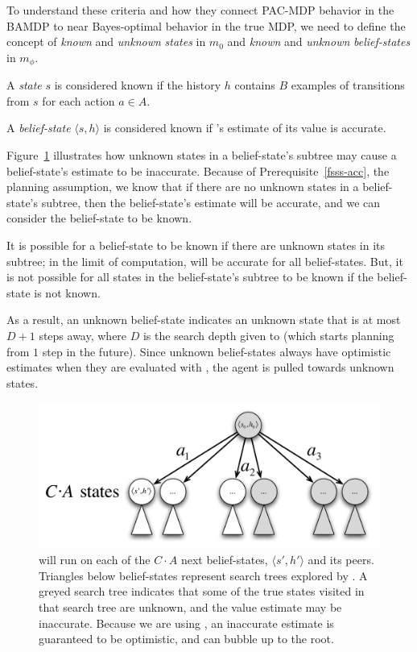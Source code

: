 To understand these criteria and how they connect PAC-MDP behavior in the BAMDP to near Bayes-optimal behavior in the true MDP, we need to define the concept of \emph{known} and \emph{unknown} \emph{states} in $m_0$ and  \emph{known} and \emph{unknown} \emph{belief-states} in $m_\phi$.

A \emph{state} $s$ is considered known if the history $h$ contains $B$ examples of transitions from $s$ for each action $a\in A$.

A \emph{belief-state} $\langle s, h \rangle$ is considered known if 's estimate of its value is accurate.

Figure~\ref{fig:bfs3tree} illustrates how unknown states in a belief-state's  subtree may cause a belief-state's estimate to be inaccurate. Because of Prerequisite~\ref{fsss-acc}, the planning assumption, we know that if there are no unknown states in a belief-state's subtree, then the belief-state's estimate will be accurate, and we can consider the belief-state to be known.

It is possible for a belief-state to be known if there are unknown states in its subtree; in the limit of computation,  will be accurate for all belief-states. But, it is not possible for all states in the belief-state's subtree to be known if the belief-state is not known.

As a result, an unknown belief-state indicates an unknown state that is at most $D+1$ steps away, where $D$ is the search depth given to  (which starts planning from $1$ step in the future). Since unknown belief-states always have optimistic estimates when they are evaluated with , the agent is pulled towards unknown states.

\begin{figure}
\vskip 0.2in
\begin{center}
\centerline{\includegraphics[scale=0.5]{bfs3tree}}
\caption{
 will run  on each of the $C\cdot A$ next belief-states, $\langle s', h' \rangle$ and its peers. Triangles below belief-states represent search trees explored by . A greyed search tree indicates that some of the true states visited in that search tree are unknown, and the value estimate may be inaccurate. Because we are using , an inaccurate estimate is guaranteed to be optimistic, and can bubble up to the root.
}
\label{fig:bfs3tree}
\end{center}
\vskip -0.2in
\end{figure} 

